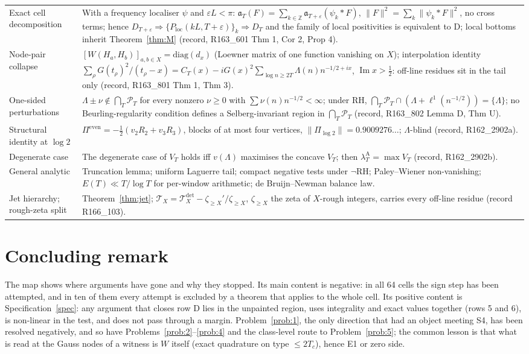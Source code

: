 \documentclass[11pt]{amsart}
\theoremstyle{definition}
\theoremstyle{remark}
\newcommand{\Z}{\mathbb Z}
\newcommand{\Iml}{\operatorname{Im}}
\newcommand{\PT}{\mathcal P_T}
\newcommand{\lamA}{\lambda^{\mathrm A}_T}
\begin{document}
\begin{longtable}{@{}p{4.2cm}p{10.3cm}@{}}
Exact cell decomposition & With a frequency localiser $\psi$ and $\varepsilon L<\pi$: $\mathfrak a_T(F)=\sum_{k\in\Z}\mathfrak a_{T+\varepsilon}(\psi_k*F)$, $\|F\|^2=\sum_k\|\psi_k*F\|^2$, no cross terms; hence $D_{T+\varepsilon}\Rightarrow\{P_{\mathrm{loc}}(kL,T+\varepsilon)\}_k\Rightarrow D_T$ and the family of local positivities is equivalent to D; local bottoms inherit Theorem~\ref{thm:M} (record, R163\_601 Thm 1, Cor 2, Prop 4). \\
Node-pair collapse & $[W(H_a,H_b)]_{a,b\in X}=\mathrm{diag}(d_x)$ (Loewner matrix of one function vanishing on $X$); interpolation identity $\sum_\rho G(t_\rho)^2/(t_\rho-x)=C_T(x)-iG(x)^2\sum_{\log n\ge2T}\Lambda(n)n^{-1/2+ix}$, $\Iml x>\frac12$: off-line residues sit in the tail only (record, R163\_801 Thm 1, Thm 3). \\
One-sided perturbations & $\Lambda\pm\nu\notin\bigcap_T\PT$ for every nonzero $\nu\ge0$ with $\sum\nu(n)n^{-1/2}<\infty$; under RH, $\bigcap_T\PT\cap(\Lambda+\ell^1(n^{-1/2}))=\{\Lambda\}$; no Beurling-regularity condition defines a Selberg-invariant region in $\bigcap_T\PT$ (record, R163\_802 Lemma D, Thm U). \\
Structural identity at $\log2$ & $\Pi^{\mathrm{even}}=-\frac12(v_2R_2+v_3R_3)$, blocks of at most four vertices, $\|\Pi_{\log2}\|=0.9009276\ldots$; $\Lambda$-blind (record, R162\_2902a). \\
Degenerate case & The degenerate case of $V_T$ holds iff $v(\Lambda)$ maximises the concave $V_T$; then $\lamA=\max V_T$ (record, R162\_2902b). \\
General analytic & Truncation lemma; uniform Laguerre tail; compact negative tests under $\neg$RH; Paley--Wiener non-vanishing; $E(T)\ll T/\log T$ for per-window arithmetic; de Bruijn--Newman balance law. \\
Jet hierarchy; rough-zeta split & Theorem~\ref{thm:jet}; $\mathcal T_X=\mathcal T^{\mathrm{det}}_X-\zeta_{\ge X}'/\zeta_{\ge X}$, $\zeta_{\ge X}$ the zeta of $X$-rough integers, carries every off-line residue (record R166\_103). \\
\end{longtable}

\section*{Concluding remark}
The map shows where arguments have gone and why they stopped. Its main content is negative: in all
64 cells the sign step has been attempted, and in ten of them every attempt is excluded by a theorem that
applies to the whole cell. Its positive content is Specification~\ref{spec}: any argument that closes row D
lies in the unpainted region, uses integrality and exact values together (rows 5 and 6), is non-linear in
the test, and does not pass through a margin. Problem~\ref{prob:1}, the only direction that had an object meeting S4, has been resolved
negatively, and so have Problems~\ref{prob:2}--\ref{prob:4} and the class-level route to Problem~\ref{prob:5}; the common lesson is that what is read at the Gauss
nodes of a witness is $W$ itself (exact quadrature on type $\le2T_c$), hence E1 or zero side.
\end{document}
